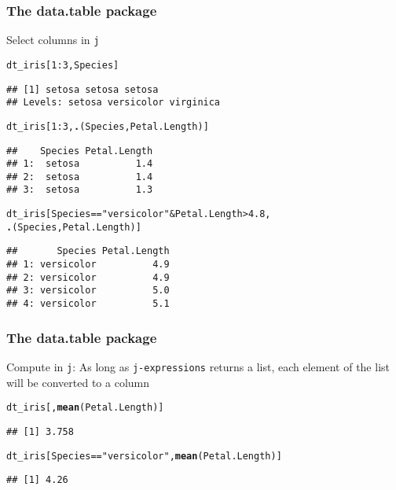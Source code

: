 \documentclass[paper=screen,mathserif]{beamer}\usepackage[]{graphicx}\usepackage[]{color}
\makeatletter
\newcommand{\hlnum}[1]{\textcolor[rgb]{0.686,0.059,0.569}{#1}}%
\newcommand{\hlstr}[1]{\textcolor[rgb]{0.192,0.494,0.8}{#1}}%
\newcommand{\hlopt}[1]{\textcolor[rgb]{0,0,0}{#1}}%
\newcommand{\hlstd}[1]{\textcolor[rgb]{0.345,0.345,0.345}{#1}}%
\newcommand{\hlkwd}[1]{\textcolor[rgb]{0.737,0.353,0.396}{\textbf{#1}}}%
\newenvironment{kframe}{%
 \def\at@end@of@kframe{}%
 \ifinner\ifhmode%
  \def\at@end@of@kframe{\end{minipage}}%
  \begin{minipage}{\columnwidth}%
 \fi\fi%
 \def\FrameCommand##1{\hskip\@totalleftmargin \hskip-\fboxsep
 \colorbox{shadecolor}{##1}\hskip-\fboxsep
     \hskip-\linewidth \hskip-\@totalleftmargin \hskip\columnwidth}%
 \MakeFramed {\advance\hsize-\width
   \@totalleftmargin\z@ \linewidth\hsize
   \@setminipage}}%
 {\par\unskip\endMakeFramed%
 \at@end@of@kframe}
\newenvironment{knitrout}{}{} %
\newcommand{\ft}[1]{\frametitle{#1}}
\makeatother
\begin{document}
\begin{frame}[fragile]
  \ft{The {\bf data.table} package}
  
  Select columns in {\tt j}
\begin{knitrout}\scriptsize
{}\color{fgcolor}\begin{kframe}
\begin{alltt}
\hlstd{dt_iris[}\hlnum{1}\hlopt{:}\hlnum{3}\hlstd{, Species]}
\end{alltt}
\begin{verbatim}
## [1] setosa setosa setosa
## Levels: setosa versicolor virginica
\end{verbatim}
\begin{alltt}
\hlstd{dt_iris[}\hlnum{1}\hlopt{:}\hlnum{3}\hlstd{,} \hlkwd{.}\hlstd{(Species, Petal.Length)]}
\end{alltt}
\begin{verbatim}
##    Species Petal.Length
## 1:  setosa          1.4
## 2:  setosa          1.4
## 3:  setosa          1.3
\end{verbatim}
\begin{alltt}
\hlstd{dt_iris[Species} \hlopt{==} \hlstr{"versicolor"} \hlopt{&} \hlstd{Petal.Length} \hlopt{>} \hlnum{4.8}\hlstd{,}
        \hlkwd{.}\hlstd{(Species, Petal.Length)]}
\end{alltt}
\begin{verbatim}
##       Species Petal.Length
## 1: versicolor          4.9
## 2: versicolor          4.9
## 3: versicolor          5.0
## 4: versicolor          5.1
\end{verbatim}
\end{kframe}
\end{knitrout}
\end{frame}

\begin{frame}[fragile]
  \ft{The {\bf data.table} package}
  
  Compute in {\tt j}: As long as {\tt j-expressions} returns a list,
  each element of the list will be converted to a column
  
\begin{knitrout}\scriptsize
{}\color{fgcolor}\begin{kframe}
\begin{alltt}
\hlstd{dt_iris[,} \hlkwd{mean}\hlstd{(Petal.Length)]}
\end{alltt}
\begin{verbatim}
## [1] 3.758
\end{verbatim}
\begin{alltt}
\hlstd{dt_iris[Species} \hlopt{==} \hlstr{"versicolor"}\hlstd{,} \hlkwd{mean}\hlstd{(Petal.Length)]}
\end{alltt}
\begin{verbatim}
## [1] 4.26
\end{verbatim}
\end{kframe}
\end{knitrout}
\end{frame}
\end{document}
